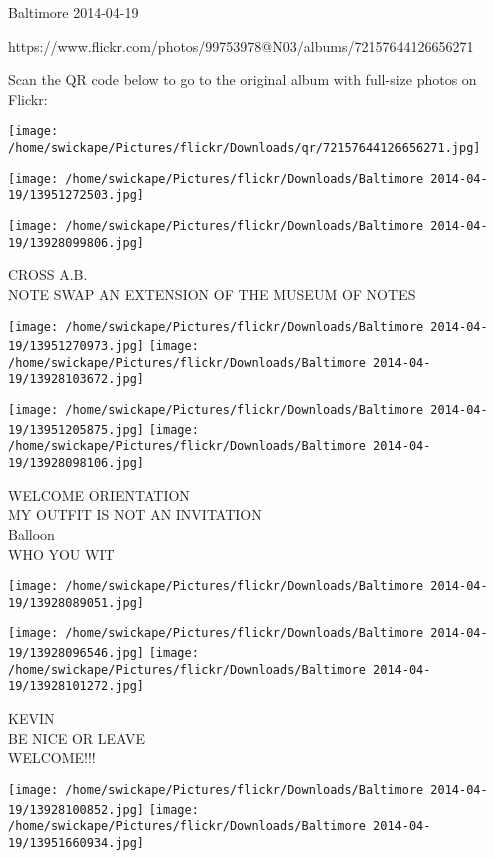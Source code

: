 \documentclass[10pt,letterpaper]{article}
\begin{document}
Baltimore 2014-04-19

https://www.flickr.com/photos/99753978@N03/albums/72157644126656271

Scan the QR code below to go to the original album with full-size photos on Flickr:

\texttt{[image: /home/swickape/Pictures/flickr/Downloads/qr/72157644126656271.jpg]}
\pagebreak

\texttt{[image: /home/swickape/Pictures/flickr/Downloads/Baltimore 2014-04-19/13951272503.jpg]}

\vspace{0.25in}
\texttt{[image: /home/swickape/Pictures/flickr/Downloads/Baltimore 2014-04-19/13928099806.jpg]}

CROSS A.B.\\
NOTE SWAP AN EXTENSION OF THE MUSEUM OF NOTES
\pagebreak

\texttt{[image: /home/swickape/Pictures/flickr/Downloads/Baltimore 2014-04-19/13951270973.jpg]}
\texttt{[image: /home/swickape/Pictures/flickr/Downloads/Baltimore 2014-04-19/13928103672.jpg]}

\texttt{[image: /home/swickape/Pictures/flickr/Downloads/Baltimore 2014-04-19/13951205875.jpg]}
\texttt{[image: /home/swickape/Pictures/flickr/Downloads/Baltimore 2014-04-19/13928098106.jpg]}

WELCOME ORIENTATION\\
MY OUTFIT IS NOT AN INVITATION\\
Balloon\\
WHO YOU WIT
\pagebreak

\texttt{[image: /home/swickape/Pictures/flickr/Downloads/Baltimore 2014-04-19/13928089051.jpg]}

\vspace{0.25in}
\texttt{[image: /home/swickape/Pictures/flickr/Downloads/Baltimore 2014-04-19/13928096546.jpg]}
\texttt{[image: /home/swickape/Pictures/flickr/Downloads/Baltimore 2014-04-19/13928101272.jpg]}

KEVIN\\
BE NICE OR LEAVE\\
WELCOME!!!
\pagebreak

\texttt{[image: /home/swickape/Pictures/flickr/Downloads/Baltimore 2014-04-19/13928100852.jpg]}
\texttt{[image: /home/swickape/Pictures/flickr/Downloads/Baltimore 2014-04-19/13951660934.jpg]}
\end{document}
